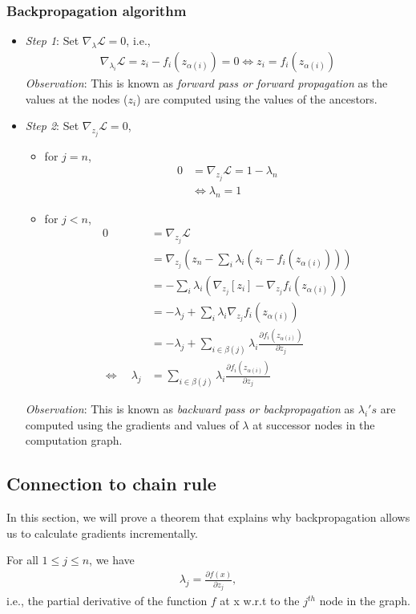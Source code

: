 \subsubsection*{Backpropagation algorithm}
\begin{itemize}
\item \textit{Step 1}: Set $\nabla_{\lambda} \mathcal{L} = 0$, i.e.,
\begin{align}
\nabla_{\lambda_i} \mathcal{L} = z_i - f_i(z_{\alpha(i)}) = 0 \Leftrightarrow z_i = f_i(z_{\alpha(i)})
\end{align}
\textit{Observation}: This is known as \textit{forward pass or forward propagation} as the values at the nodes ($z_i$) are computed using the values of the ancestors.
\item \textit{Step 2}: Set $\nabla_{z_j} \mathcal{L} = 0$, 
\begin{itemize}
\item for $j = n$, 
\begin{align*}
0 &= \nabla_{z_j} \mathcal{L} = 1 - \lambda_n \\
&\Leftrightarrow \lambda_n = 1
\end{align*}
\item for $j < n$,
\begin{align}
0  &= \nabla_{z_j} \mathcal{L} \nonumber \\
&=  \nabla_{z_j} (z_n - \sum_i \lambda_i (z_i - f_i(z_{\alpha(i)}))) \nonumber \\
&= - \sum_i \lambda_i (\nabla_{z_j} [z_i] - \nabla_{z_j} f_i(z_{\alpha(i)})) \nonumber \\
&= -\lambda_j + \sum_i \lambda_i \nabla_{z_j} f_i(z_{\alpha(i)}) \nonumber \\
&= -\lambda_j + \sum_{i \in \beta(j)} \lambda_i \frac{\partial f_i(z_{\alpha(i)})}{\partial z_j} \nonumber \\
\Leftrightarrow\quad \lambda_j &= \sum_{i \in \beta(j)} \lambda_i \frac{\partial f_i(z_{\alpha(i)})}{\partial z_j} \nonumber
\end{align}
\end{itemize}
\textit{Observation}: This is known as \textit{backward pass or backpropagation} as $\lambda_i's$ are computed using the gradients and values of $\lambda$ at successor nodes in the computation graph. 
\end{itemize}


\subsection{Connection to chain rule}
In this section, we will prove a theorem that explains why backpropagation allows us to calculate gradients incrementally.
\begin{theorem}
For all $1 \leq j \leq n$, we have
\begin{align*}
\lambda_j = \frac{\partial f(x)}{\partial z_j},
\end{align*}
i.e., the partial derivative of the function $f$ at x w.r.t to the $j^{th}$ node in the graph.
\end{theorem}

